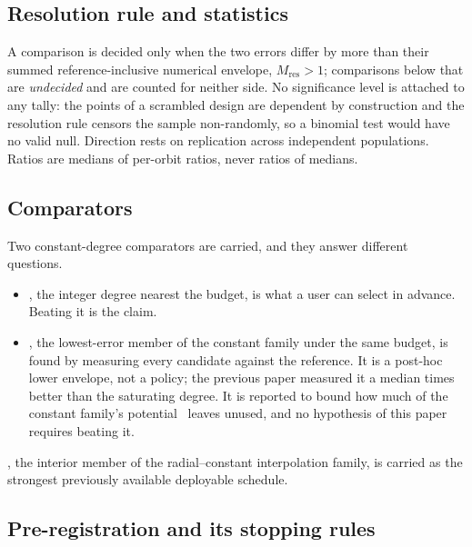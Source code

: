 
\subsection{Resolution rule and statistics}

A comparison is decided only when the two errors differ by more than their
summed reference-inclusive numerical envelope, $M_{\mathrm{res}}>1$; comparisons
below that are \emph{undecided} and are counted for neither side. No
significance level is attached to any tally: the points of a scrambled design
are dependent by construction and the resolution rule censors the sample
non-randomly, so a binomial test would have no valid null. Direction rests on
replication across independent populations. Ratios are medians of per-orbit
ratios, never ratios of medians.

\subsection{Comparators}
\label{sec:setup-comparators}

Two constant-degree comparators are carried, and they answer different
questions.

\begin{itemize}
  \item \Fop, the integer degree nearest the budget, is what a user can select
    in advance. Beating it is the claim.
  \item \Fenv, the lowest-error member of the constant family under the same
    budget, is found by measuring every candidate against the reference. It is
    a post-hoc lower envelope, not a policy; the previous paper measured it a
    median  times better than the saturating degree. It is reported
    to bound how much of the constant family's potential \Fop\ leaves unused,
    and no hypothesis of this paper requires beating it.
\end{itemize}

\Rint, the interior member of the radial--constant interpolation family, is
carried as the strongest previously available deployable schedule.

\subsection{Pre-registration and its stopping rules}
\label{sec:setup-prereg}

